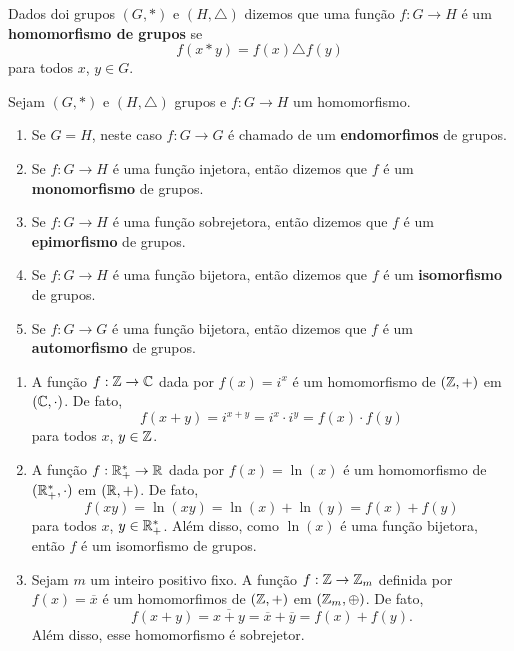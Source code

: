 
\begin{definicao}
	Dados doi grupos $(G, *)$ e $(H,\triangle)$ dizemos que uma fun\c{c}\~ao $f : G \to H$ \'e um \textbf{homomorfismo de grupos} se
	\[
		f(x * y) = f(x)\triangle f(y)
	\]
	para todos $x$, $y \in G$.
\end{definicao}

\begin{observacao}
	Sejam $(G, *)$ e $(H, \triangle)$ grupos e $f : G \to H$ um homomorfismo.
	\begin{enumerate}[label={\arabic*})]
		\item Se $G = H$, neste caso $f : G \to G$ \'e chamado de um \textbf{endomorfimos} de grupos.
		\item Se $f : G \to H$ \'e uma fun\c{c}\~ao injetora, ent\~ao dizemos que $f$ \'e um \textbf{monomorfismo} de grupos.
		\item Se $f : G \to H$ \'e uma fun\c{c}\~ao sobrejetora, ent\~ao dizemos que $f$ \'e um \textbf{epimorfismo} de grupos.
		\item Se $f : G \to H$ \'e uma fun\c{c}\~ao bijetora, ent\~ao dizemos que $f$ \'e um \textbf{isomorfismo} de grupos.
		\item Se $f : G \to G$ \'e uma fun\c{c}\~ao bijetora, ent\~ao dizemos que $f$ \'e um \textbf{automorfismo} de grupos.
	\end{enumerate}
\end{observacao}

\begin{exemplos}
	\begin{enumerate}[label={\arabic*})]
		\item A fun\c{c}\~ao $f : \mathbb{Z} \to \mathbb{C}$ dada por $f(x) = i^x$ \'e um homomorfismo de $(\mathbb{Z}, +)$ em $(\mathbb{C}, \cdot)$. De fato,
		\[
			f(x + y) = i^{x + y} = i^x\cdot i^y = f(x)\cdot f(y)
		\]
		para todos $x$, $y \in \mathbb{Z}$.

		\item A fun\c{c}\~ao $f : \mathbb{R}^*_+ \to \mathbb{R}$ dada por $f(x) = \ln(x)$ \'e um homomorfismo de $(\mathbb{R}^*_+, \cdot)$ em $(\mathbb{R}, +)$. De fato,
		\[
			f(xy) = \ln(xy) = \ln(x) + \ln(y) = f(x) + f(y)
		\]
		para todos $x$, $y \in \mathbb{R}^*_+$. Al\'em disso, como $\ln(x)$ \'e uma fun\c{c}\~ao bijetora, ent\~ao $f$ \'e um isomorfismo de grupos.

		\item Sejam $m$ um inteiro positivo fixo. A fun\c{c}\~ao $f: \mathbb{Z} \to \mathbb{Z}_m$ definida por $f(x) = \overline{x}$ \'e um homomorfimos de $(\mathbb{Z}, +)$ em $(\mathbb{Z}_m, \oplus)$. De fato,
		\[
			f(x + y) = \overline{x + y} = \overline{x} + \overline{y} = f(x) + f(y).
		\]
		Al\'em disso, esse homomorfismo \'e sobrejetor.
	\end{enumerate}
\end{exemplos}

